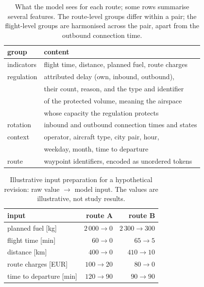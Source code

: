 \documentclass[a4paper,conference]{IEEEtran}
\begin{document}
\begin{table}[t]
\caption{What the model sees for each route; some rows summarise several
features. The route-level groups differ within a pair; the flight-level
groups are harmonised across the pair, apart from the outbound connection
time.}
\label{tab:features} \centering\footnotesize
\begin{tabular}{ll}
\toprule
group & content \\
\midrule
indicators & flight time, distance, planned fuel, route charges \\
regulation & attributed delay (own, inbound, outbound), \\ & their
count, reason, and the type and identifier \\ & of the protected
volume, meaning the airspace \\ & whose capacity the regulation
protects \\
rotation   & inbound and outbound connection times and states \\
context    & operator, aircraft type, city pair, hour, \\
           & weekday, month, time to departure \\
route      & waypoint identifiers, encoded as unordered tokens \\
\bottomrule
\end{tabular}
\end{table}

\begin{table}[t]
\caption{Illustrative input preparation for a hypothetical revision:
raw value $\rightarrow$ model input. The values are illustrative, not
study results.}
\label{tab:encoding-example}
\centering\footnotesize
\begin{tabular}{lrr}
\toprule
input & route A & route B \\
\midrule
planned fuel [kg] & $2\,000\rightarrow0$ & $2\,300\rightarrow300$ \\
flight time [min] & $60\rightarrow0$ & $65\rightarrow5$ \\
distance [km] & $400\rightarrow0$ & $410\rightarrow10$ \\
route charges [EUR] & $100\rightarrow20$ & $80\rightarrow0$ \\
time to departure [min] & $120\rightarrow90$ & $90\rightarrow90$ \\
\bottomrule
\end{tabular}
\end{table}
\end{document}
